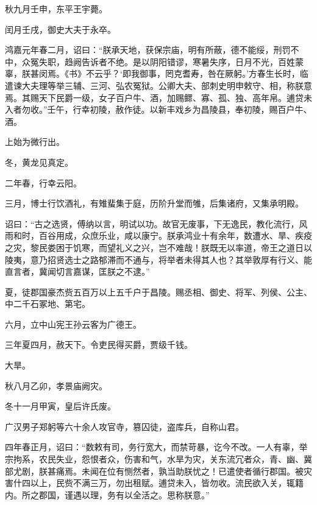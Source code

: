 \documentclass[12pt,UTF8]{ctexbook}
\begin{document}
秋九月壬申，东平王宇薨。



闰月壬戌，御史大夫于永卒。



鸿嘉元年春二月，诏曰：“朕承天地，获保宗庙，明有所蔽，德不能绥，刑罚不中，众冤失职，趋阙告诉者不绝。是以阴阳错谬，寒暑失序，日月不光，百姓蒙辜，朕甚闵焉。《书》不云乎？‘即我御事，罔克耆寿，咎在厥躬。’方春生长时，临遣谏大夫理等举三辅、三河、弘农冤狱。公卿大夫、部刺史明申敕守、相，称朕意焉。其赐天下民爵一级，女子百户牛、酒，加赐鳏、寡、孤、独、高年帛。逋贷未入者勿收。”壬午，行幸初陵，赦作徒。以新丰戏乡为昌陵县，奉初陵，赐百户牛、酒。



上始为微行出。



冬，黄龙见真定。



二年春，行幸云阳。



三月，博士行饮酒礼，有雉蜚集于庭，历阶升堂而雊，后集诸府，又集承明殿。



诏曰：“古之选贤，傅纳以言，明试以功。故官无废事，下无逸民，教化流行，风雨和时，百谷用成，众庶乐业，咸以康宁。朕承鸿业十有余年，数遭水、旱、疾疫之灾，黎民娄困于饥寒，而望礼义之兴，岂不难哉！朕既无以率道，帝王之道日以陵夷，意乃招贤选士之路郁滞而不通与，将举者未得其人也？其举敦厚有行义、能直言者，冀闻切言嘉谋，匡朕之不逮。”



夏，徒郡国豪杰赀五百万以上五千户于昌陵。赐丞相、御史、将军、列侯、公主、中二千石冢地、第宅。



六月，立中山宪王孙云客为广德王。



三年夏四月，赦天下。令吏民得买爵，贾级千钱。



大旱。



秋八月乙卯，孝景庙阙灾。



冬十一月甲寅，皇后许氏废。



广汉男子郑躬等六十余人攻官寺，篡囚徒，盗库兵，自称山君。



四年春正月，诏曰：“数敕有司，务行宽大，而禁苛暴，讫今不改。一人有辜，举宗拘系，农民失业，怨恨者众，伤害和气，水旱为灾，关东流冗者众，青、幽、冀部尤剧，朕甚痛焉。未闻在位有恻然者，孰当助朕忧之！已遣使者循行郡国。被灾害什四以上，民赀不满三万，勿出租赋。逋贷未入，皆勿收。流民欲入关，辄籍内。所之郡国，谨遇以理，务有以全活之。思称朕意。”
\end{document}
